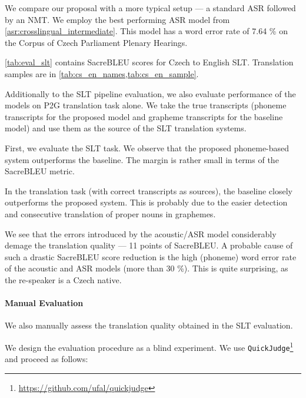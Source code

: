 We compare our proposal with a more typical setup --- a standard ASR followed by an NMT. We employ the best performing ASR model from \cref{asr:crosslingual_intermediate}. This model has a word error rate of 7.64 \% on the Corpus of Czech Parliament Plenary Hearings.

\cref{tab:eval_slt} contains SacreBLEU scores for Czech to English SLT. Translation samples are in \cref{tab:cs_en_names,tab:cs_en_sample}.

Additionally to the SLT pipeline evaluation, we also evaluate performance of the models on P2G translation task alone. We take the true transcripts (phoneme transcripts for the proposed model and grapheme transcripts for the baseline model) and use them as the source of the SLT translation systems.

First, we evaluate the SLT task. We observe that the proposed phoneme-based system outperforms the baseline. The margin is rather small in terms of the SacreBLEU metric.

In the translation task (with correct transcripts as sources), the baseline closely outperforms the proposed system. This is probably due to the easier detection and consecutive translation of proper nouns in graphemes.

We see that the errors introduced by the acoustic/ASR model considerably demage the translation quality --- 11 points of SacreBLEU. A probable cause of such a drastic SacreBLEU score reduction is the high (phoneme) word error rate of the acoustic and ASR models (more than 30 \%). This is quite surprising, as the re-speaker is a Czech native.

\paragraph{Manual Evaluation}
We also manually assess the translation quality obtained in the SLT evaluation.

We design the evaluation procedure as a blind experiment. We use \texttt{QuickJudge}\footnote{\url{https://github.com/ufal/quickjudge}} and proceed as follows:

